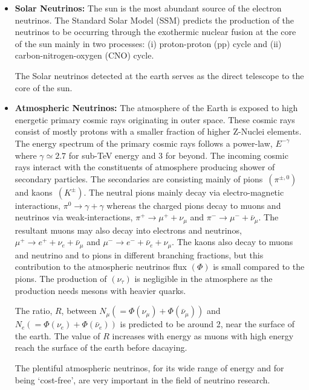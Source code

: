 \begin{itemize}
\item \textbf{Solar Neutrinos:} The sun is the most abundant source of
  the electron neutrinos. The Standard Solar Model (SSM)\cite{SSM}
  predicts the production of the neutrinos to be occurring through the
  exothermic nuclear fusion at the core of the sun mainly in two
  processes: (i) proton-proton (pp) cycle and
  (ii) carbon-nitrogen-oxygen (CNO) cycle.
  
  The Solar neutrinos detected at the earth serves as the direct
  telescope to the core of the sun.
  
\item \textbf{Atmospheric Neutrinos:} The atmosphere of the Earth is
  exposed to high energetic primary cosmic rays originating in outer
  space. These cosmic rays consist of mostly protons with a smaller
  fraction of higher \mbox{Z-Nuclei} elements\cite{cosmic1}. The
  energy spectrum of the primary cosmic rays follows a power-law,
  $E^{-\gamma}$ where $\gamma\simeq 2.7$ for sub-TeV energy and 3 for
  beyond.  The incoming cosmic rays interact with the constituents
  of atmosphere producing shower of secondary particles.
  The secondaries are consisting mainly of
  \mbox{pions $\left(\pi^{\pm,0}\right)$} and
  \mbox{kaons $\left(K^{\pm}\right)$}. The neutral pions mainly decay
  via electro-magnetic interactions, $\pi^0 \rightarrow \gamma+\gamma$
  whereas the charged pions decay to muons and neutrinos via
  weak-interactions, $\pi^+ \rightarrow \mu^+ + \nu_{\mu}$ and
  $\pi^- \rightarrow \mu^- + \bar{\nu}_{\mu}$. The resultant muons may
  also decay into electrons and neutrinos,
  $\mu^+ \rightarrow e^+ + \nu_{e} + \bar{\nu}_{\mu}$ and
  $\mu^- \rightarrow e^- + \bar{\nu}_{e} + \nu_{\mu}$. The kaons also
  decay to muons and neutrino and to pions in different branching
  fractions, but this contribution to the atmospheric neutrinos flux
  $\left(\Phi\right)$ is small compared to the pions. The production
  of $\left(\nu_{\tau}\right)$ is negligible in the atmosphere as the
  production needs mesons with heavier quarks.
  
  The ratio, $R$, between $N_{\mu}\left(=\Phi\left(\nu_{\mu}\right)+\Phi\left(\bar{\nu}_{\mu}\right)\right)$ and $N_{e}\left(=\Phi\left(\nu_{e}\right)+\Phi\left(\bar{\nu}_{e}\right)\right)$ is predicted to be around 2,
  near the surface of the earth. The value of $R$ increases with
  energy as muons with high energy reach the surface of the earth
  before dacaying.
  
  The plentiful atmospheric neutrinos, for its wide range of energy
  and for being `cost-free', are very important in the field of
  neutrino research.
  

\end{itemize}
